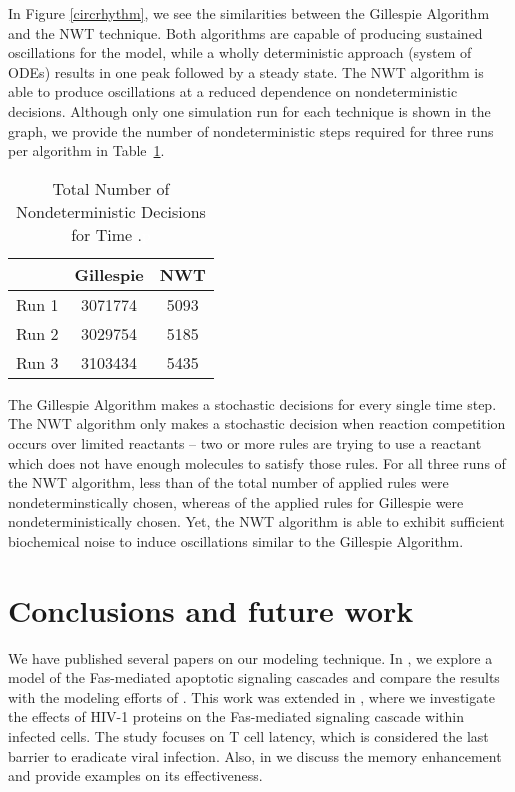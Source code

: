 \documentclass[copyright]{eptcs}
\begin{document}
In Figure \ref{circrhythm}, we see the similarities between the Gillespie Algorithm and the NWT technique.  Both algorithms are capable of producing sustained oscillations for the model, while a wholly deterministic approach (system of ODEs) results in one peak followed by a steady state.  The NWT algorithm is able to produce oscillations at a reduced dependence on nondeterministic decisions.  Although only one simulation run for each technique is shown in the graph, we provide the number of nondeterministic steps required for three runs per algorithm in Table~\ref{nondeter}.
\vspace{-1mm}

{\renewcommand{\arraystretch}{1.2}\begin{table}[h!t!p!]
\caption{Total Number of Nondeterministic Decisions for Time .\textcolor{white}{p}} \label{nondeter}\vspace{1mm}
\centering
\begin{tabular}{|l|c|c|}
\hline
 & Gillespie & NWT\\
\hline
Run 1 & 3071774 & 5093\\
\hline
Run 2 & 3029754 & 5185\\
\hline
Run 3 & 3103434 & 5435\\
\hline
\end{tabular}
\end{table}}

The Gillespie Algorithm makes a stochastic decisions for every single time step.  The NWT algorithm only makes a stochastic decision when reaction competition occurs over limited reactants -- two or more rules are trying to use a reactant which does not have enough molecules to satisfy those rules.  For all three runs of the NWT algorithm, less than  of the total number of applied rules were nondeterminstically chosen, whereas  of the applied rules for Gillespie were nondeterministically chosen.  Yet, the NWT algorithm is able to exhibit sufficient biochemical noise to induce oscillations similar to the Gillespie Algorithm.


\section{Conclusions and future work}\label{conclusions}

We have published several papers on our modeling technique.  In \cite{jack07,jack08}, we explore a model of the Fas-mediated apoptotic signaling cascades and compare the results with the modeling efforts of \cite{hua05}.  This work was extended in \cite{jack08hiv}, where we investigate the effects of HIV-1 proteins on the Fas-mediated signaling cascade within infected cells.  The study focuses on T cell latency, which is considered the last barrier to eradicate viral infection.  Also, in \cite{jack09} we discuss the memory enhancement and provide examples on its effectiveness.
\end{document}

